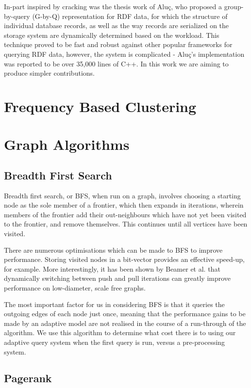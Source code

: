 In-part inspired by cracking was the thesis work of Aluç, who proposed a group-by-query (G-by-Q)
representation for RDF data, for which the structure of individual database records, as well as
the way records are serialized on the storage system are dynamically determined based on the
workload. This technique proved to be fast and robust against other popular frameworks for
querying RDF data, however, the system is complicated - Aluç's implementation was reported to be
over 35,000 lines of C++. In this work we are aiming to produce simpler contributions.

\section{Frequency Based Clustering}

\section{Graph Algorithms}

\subsection{Breadth First Search}

Breadth first search, or BFS, when run on a graph, involves choosing a starting node as the sole
member of a frontier, which then expands in iterations, wherein members of the frontier add their
out-neighbours which have not yet been visited to the frontier, and remove themselves. This continues
until all vertices have been visited.

There are numerous optimisations which can be made to BFS to improve performance. Storing visited
nodes in a bit-vector provides an effective speed-up, for example. More interestingly, it has been
shown by Beamer et al. that dynamically switching between push and pull iterations can greatly
improve performance on low-diameter, scale free graphs.

The most important factor for us in considering BFS is that it queries the outgoing edges of each
node just once, meaning that the performance gains to be made by an adaptive model are not realised
in the course of a run-through of the algorithm. We use this algorithm to determine what cost there
is to using our adaptive query system when the first query is run, versus a pre-processing system.

\subsection{Pagerank}

